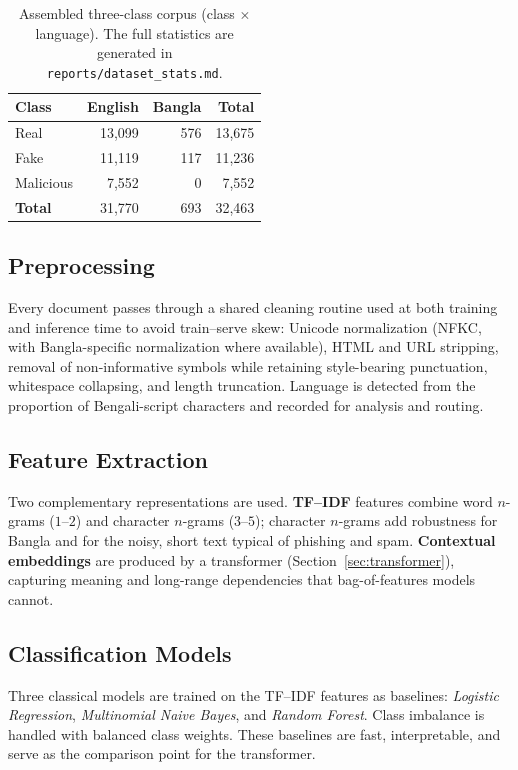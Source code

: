 \begin{table}[t]
  \centering
  \caption{Assembled three-class corpus (class $\times$ language). The full
  statistics are generated in \texttt{reports/dataset\_stats.md}.}
  \label{tab:dataset}
  \begin{tabular}{lrrr}
    \hline
    \textbf{Class} & \textbf{English} & \textbf{Bangla} & \textbf{Total} \\
    \hline
    Real      & 13{,}099 & 576 & 13{,}675 \\
    Fake      & 11{,}119 & 117 & 11{,}236 \\
    Malicious &  7{,}552 &   0 &  7{,}552 \\
    \hline
    \textbf{Total} & 31{,}770 & 693 & 32{,}463 \\
    \hline
  \end{tabular}
\end{table}

\subsection{Preprocessing}
Every document passes through a shared cleaning routine used at both training and
inference time to avoid train--serve skew: Unicode normalization (NFKC, with
Bangla-specific normalization where available), HTML and URL stripping, removal
of non-informative symbols while retaining style-bearing punctuation, whitespace
collapsing, and length truncation. Language is detected from the proportion of
Bengali-script characters and recorded for analysis and routing.

\subsection{Feature Extraction}
Two complementary representations are used. \textbf{TF--IDF} features combine
word $n$-grams ($1$--$2$) and character $n$-grams ($3$--$5$); character $n$-grams
add robustness for Bangla and for the noisy, short text typical of phishing and
spam. \textbf{Contextual embeddings} are produced by a transformer
(Section~\ref{sec:transformer}), capturing meaning and long-range dependencies
that bag-of-features models cannot.

\subsection{Classification Models}
Three classical models are trained on the TF--IDF features as baselines:
\emph{Logistic Regression}, \emph{Multinomial Naive Bayes}, and \emph{Random
Forest}. Class imbalance is handled with balanced class weights. These baselines
are fast, interpretable, and serve as the comparison point for the transformer.

